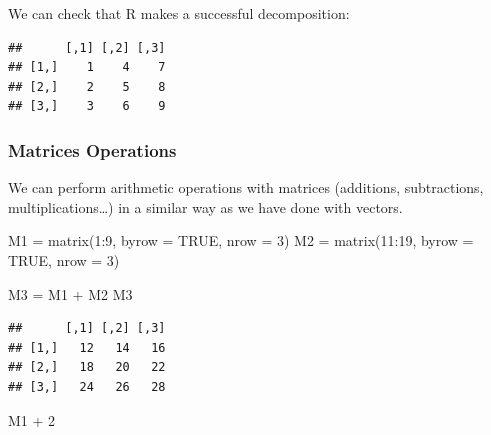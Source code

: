 \documentclass[
]{book}
\newenvironment{Shaded}{\begin{snugshade}}{\end{snugshade}}
\newcommand{\AttributeTok}[1]{\textcolor[rgb]{0.77,0.63,0.00}{#1}}
\newcommand{\ConstantTok}[1]{\textcolor[rgb]{0.00,0.00,0.00}{#1}}
\newcommand{\DecValTok}[1]{\textcolor[rgb]{0.00,0.00,0.81}{#1}}
\newcommand{\FunctionTok}[1]{\textcolor[rgb]{0.00,0.00,0.00}{#1}}
\newcommand{\NormalTok}[1]{#1}
\newcommand{\OtherTok}[1]{\textcolor[rgb]{0.56,0.35,0.01}{#1}}
\newcommand{\SpecialCharTok}[1]{\textcolor[rgb]{0.00,0.00,0.00}{#1}}
\theoremstyle{definition}
\theoremstyle{definition}
\theoremstyle{definition}
\theoremstyle{definition}
\theoremstyle{remark}
\begin{document}
We can check that R makes a successful decomposition:

\begin{Shaded}
\end{Shaded}

\begin{verbatim}
##      [,1] [,2] [,3]
## [1,]    1    4    7
## [2,]    2    5    8
## [3,]    3    6    9
\end{verbatim}

\hypertarget{matrices-operations}{%
\subsubsection{Matrices Operations}\label{matrices-operations}}

We can perform arithmetic operations with matrices (additions, subtractions, multiplications\ldots) in a similar way as we have done with vectors.

\begin{Shaded}
\begin{Highlighting}[]
\NormalTok{M1 }\OtherTok{=} \FunctionTok{matrix}\NormalTok{(}\DecValTok{1}\SpecialCharTok{:}\DecValTok{9}\NormalTok{, }\AttributeTok{byrow =} \ConstantTok{TRUE}\NormalTok{, }\AttributeTok{nrow =} \DecValTok{3}\NormalTok{)}
\NormalTok{M2 }\OtherTok{=} \FunctionTok{matrix}\NormalTok{(}\DecValTok{11}\SpecialCharTok{:}\DecValTok{19}\NormalTok{, }\AttributeTok{byrow =} \ConstantTok{TRUE}\NormalTok{, }\AttributeTok{nrow =} \DecValTok{3}\NormalTok{)}

\NormalTok{M3 }\OtherTok{=}\NormalTok{ M1 }\SpecialCharTok{+}\NormalTok{ M2}
\NormalTok{M3}
\end{Highlighting}
\end{Shaded}

\begin{verbatim}
##      [,1] [,2] [,3]
## [1,]   12   14   16
## [2,]   18   20   22
## [3,]   24   26   28
\end{verbatim}

\begin{Shaded}
\begin{Highlighting}[]
\NormalTok{M1 }\SpecialCharTok{+} \DecValTok{2}
\end{Highlighting}
\end{Shaded}
\end{document}
